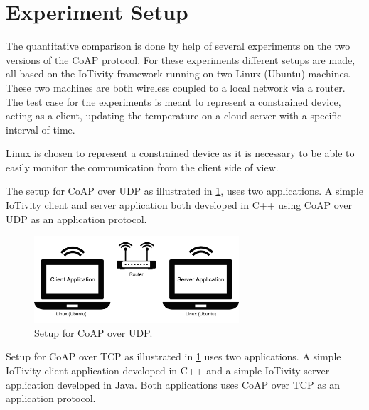 \section{Experiment Setup}
The quantitative comparison is done by help of several experiments on the two versions of the CoAP protocol. For these experiments different setups are made, all based on the IoTivity framework running on two Linux (Ubuntu) machines. These two machines are both wireless coupled to a local network via a router. The test case for the experiments is meant to represent a constrained device, acting as a client, updating the temperature on a cloud server with a specific interval of time. 

Linux is chosen to represent a constrained device as it is necessary to be able to easily monitor the communication from the client side of view.

The setup for CoAP over UDP as illustrated in \figurename \ref{fig:setup}, uses two applications. A simple IoTivity client and server application both developed in C++ using CoAP over UDP as an application protocol.
\begin{figure}[bht]
	\centering
	\includegraphics[width=3in]{gfx/setupa}
	\caption{Setup for CoAP over UDP.}
	\label{fig:setup}
\end{figure}

Setup for CoAP over TCP as illustrated in \figurename \ref{fig:setup} uses two applications. A simple IoTivity client application developed in C++ and a simple IoTivity server application developed in Java. Both applications uses CoAP over TCP as an application protocol.

